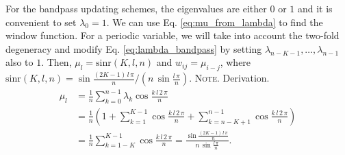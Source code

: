 \documentclass[preprint, superscriptaddress, floatfix]{revtex4-1}
\newcommand{\note}[1]{{\color{DarkGreen}\footnotesize \textsc{Note.} #1}}
\begin{document}
For the bandpass updating schemes,
the eigenvalues are either $0$ or $1$ and
it is convenient to set $\lambda_0 = 1$.
%
We can use Eq. \eqref{eq:mu_from_lambda}
to find the window function.
%
For a periodic variable,
we will take into account the two-fold degeneracy
and modify Eq. \eqref{eq:lambda_bandpass}
by setting $\lambda_{n-K-1}, \dots, \lambda_{n-1}$
also to $1$.
%
Then, $\mu_l = \mathrm{sinr}(K, l, n)$ and $w_{ij} = \mu_{i-j}$,
where
$\mathrm{sinr}(K, l, n)
  =
  \sin
  \frac{ (2 K - 1) \, l \, \pi }
       {              n        }
  / \left( n \, \sin \frac{ l \, \pi } { n } \right)$.
%
\note{Derivation.
\begin{align*}
\mu_l
&=
\frac 1 n \sum_{k = 0}^{n-1} \lambda_k \cos \frac{ k \, l \, 2 \, \pi } { n }
\\
&=
\frac{1}{n}
\left(
  1 +
  \sum_{k=1}^{K-1}
  \cos \frac { k \, l \, 2 \, \pi } { n }
  +
  \sum_{k=n-K+1}^{n-1}
  \cos \frac { k \, l \, 2 \, \pi } { n }
\right)
\\
&=
\frac 1 n
\sum_{k=1-K}^{K-1}
\cos \frac { k \, l \, 2 \, \pi } { n }
=
  \frac{
    \sin
    \frac{ (2 K - 1) \, l \, \pi }
         {              n        }
  }
  {
    n \, \sin \frac{ l \, \pi } { n }
  }
.
\end{align*}
}
\end{document}
